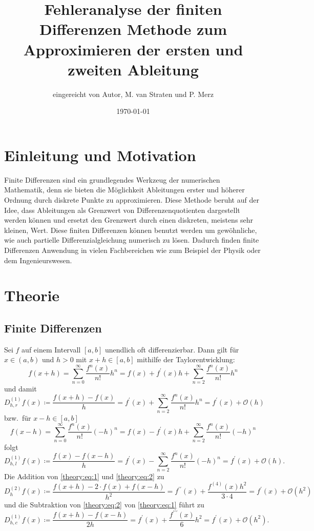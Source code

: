\documentclass{scrartcl}
\title{Fehleranalyse der finiten Differenzen Methode zum Approximieren der ersten und zweiten Ableitung}
\author{%
  eingereicht von Autor, M. van Straten und P. Merz
}
\date{\today}
\newcommand{\BigO}{\mathcal{O}}
\theoremstyle{remark}
\begin{document}
\maketitle
\tableofcontents
\cleardoublepage%

\section{Einleitung und Motivation}
Finite Differenzen sind ein grundlegendes Werkzeug der numerischen Mathematik,
denn sie bieten die Möglichkeit Ableitungen erster und höherer Ordnung durch
diskrete Punkte zu approximieren. Diese Methode beruht auf der Idee, dass
Ableitungen als Grenzwert von Differenzenquotienten dargestellt werden können
und ersetzt den Grenzwert durch einen diskreten, meistens sehr kleinen, Wert.
Diese finiten Differenzen können benutzt werden um gewöhnliche, wie auch
partielle Differenzialgleichung numerisch zu lösen. Dadurch finden finite
Differenzen Anwendung in vielen Fachbereichen wie zum Beispiel der Physik oder
dem Ingenieurswesen.\ \cite{FiniteDifferenzen}

\section{Theorie}

\subsection{Finite Differenzen}
Sei \(f\) auf einem Intervall \([a,b]\) unendlich oft differenzierbar. Dann
gilt für \(x \in (a,b)\) und \(h > 0\) mit \(x + h \in [a,b]\) mithilfe der
Taylorentwicklung:
\begin{equation} \label{theory:eq:1}
    f(x + h)
    = \sum_{n=0}^{\infty} \frac{f^n(x)}{n!} h^n
    = f(x) + f^\prime(x) h + \sum_{n=2}^\infty \frac{f^n(x)}{n!} h^n
\end{equation}
und damit
\[
    D_{h, r}^{(1)} f(x)
    \coloneq \frac{f(x + h) - f(x)}{h}
    = f^\prime(x) + \sum_{n=2}^\infty \frac{f^n(x)}{n!} h^n
    = f^\prime(x) + \BigO(h)
\]
bzw.\ für \(x - h \in [a,b]\)
\begin{equation} \label{theory:eq:2}
    f(x - h)
    = \sum_{n=0}^\infty \frac{f^n(x)}{n!} {(-h)}^n
    = f(x) - f^{\prime}(x)h + \sum_{n=2}^\infty \frac{f^n(x)}{n!} {(-h)}^n
\end{equation}
folgt
\[
    D_{h, l}^{(1)} f(x)
    \coloneq \frac{f(x) - f(x - h)}{h}
    = f^\prime(x) - \sum_{n=2}^\infty \frac{f^n(x)}{n!} {(-h)}^n
    = f^\prime(x) + \BigO(h).
\]
Die Addition von \autoref{theory:eq:1} und \autoref{theory:eq:2} zu
\[
    D_h^{(2)} f(x)
    \coloneq \frac{f(x + h) - 2 \cdot f(x) + f(x - h)}{h^2}
    = f^{\prime\prime}(x) + \frac{f^{(4)}(x) h^2}{3 \cdot 4}
    = f^\prime(x) + \BigO(h^2)
\]
und die Subtraktion von \autoref{theory:eq:2} von \autoref{theory:eq:1} führt
  zu
\[
    D_{h, c}^{(1)} f(x)
    \coloneq \frac{f(x + h) - f(x - h)}{2h}
    = f^\prime(x) + \frac{f^{\prime\prime\prime}(x)}{6} h^2
    = f^\prime(x) + \BigO(h^2).
\]~\cite{NumericalDifferentiation}
\end{document}
